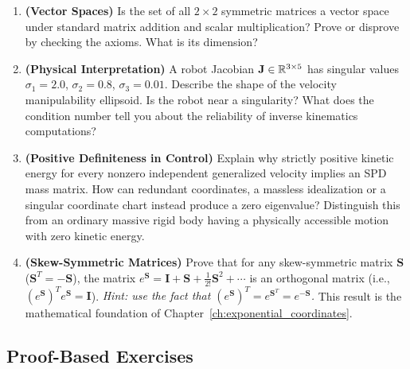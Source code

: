 \begin{enumerate}[resume]
    \item \textbf{(Vector Spaces)} Is the set of all $2 \times 2$ symmetric matrices a vector space under standard matrix addition and scalar multiplication? Prove or disprove by checking the axioms. What is its dimension?

    \item \textbf{(Physical Interpretation)} A robot Jacobian $\mathbf{J} \in \mathbb{R}^{3 \times 5}$ has singular values $\sigma_1 = 2.0$, $\sigma_2 = 0.8$, $\sigma_3 = 0.01$. Describe the shape of the velocity manipulability ellipsoid. Is the robot near a singularity? What does the condition number tell you about the reliability of inverse kinematics computations?

    \item \textbf{(Positive Definiteness in Control)} Explain why strictly positive kinetic energy for every nonzero independent generalized velocity implies an SPD mass matrix. How can redundant coordinates, a massless idealization or a singular coordinate chart instead produce a zero eigenvalue? Distinguish this from an ordinary massive rigid body having a physically accessible motion with zero kinetic energy.

    \item \textbf{(Skew-Symmetric Matrices)} Prove that for any skew-symmetric matrix $\mathbf{S}$ ($\mathbf{S}^T = -\mathbf{S}$), the matrix $e^{\mathbf{S}} = \mathbf{I} + \mathbf{S} + \frac{1}{2!}\mathbf{S}^2 + \cdots$ is an orthogonal matrix (i.e., $(e^{\mathbf{S}})^T e^{\mathbf{S}} = \mathbf{I}$). \emph{Hint: use the fact that $(e^{\mathbf{S}})^T = e^{\mathbf{S}^T} = e^{-\mathbf{S}}$.} This result is the mathematical foundation of Chapter~\ref{ch:exponential_coordinates}.
\end{enumerate}

\subsection*{Proof-Based Exercises}

